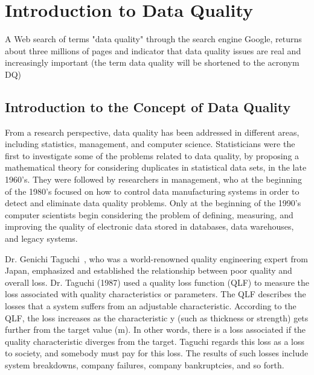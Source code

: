 

\ifpdf
    \graphicspath{{Chapter1/Figs/Raster/}{Chapter1/Figs/PDF/}{Chapter1/Figs/}}
\else
    \graphicspath{{Chapter1/Figs/Vector/}{Chapter1/Figs/}}
\fi

\chapter{Introduction to Data Quality}

A Web search of terms "data quality" through the search engine Google, returns about three millions of pages
and indicator that data quality issues are real and increasingly important (the term data quality will be shortened to the acronym DQ)

\ifpdf
    \graphicspath{{Chapter1/Figs/Raster/}{Chapter1/Figs/PDF/}{Chapter1/Figs/}}
\else
    \graphicspath{{Chapter1/Figs/Vector/}{Chapter1/Figs/}}
\fi

\section{Introduction to the Concept of Data Quality}

From a research perspective, data quality has been addressed in different
areas, including statistics, management, and computer science. Statisticians were the first to investigate some of the problems related to data quality, by
proposing a mathematical theory for considering duplicates in statistical data sets, in the late 1960's. They were followed by researchers in management, who
at the beginning of the 1980's focused on how to control data manufacturing systems in order to detect and eliminate data quality problems. Only at the
beginning of the 1990's computer scientists begin considering the problem of defining, measuring, and improving the quality of electronic data stored in
databases, data warehouses, and legacy systems.

Dr. Genichi Taguchi~\citep{Jugulum14}, who was a world-renowned quality engineering expert from Japan, emphasized and established the relationship between
poor quality and overall loss. Dr. Taguchi (1987) used a quality loss function (QLF) to measure the loss associated with quality characteristics
or parameters. The QLF describes the losses that a system suffers from an adjustable characteristic. According to the QLF, the loss increases as
the characteristic y (such as thickness or strength) gets further from the target value (m). In other words, there is a loss associated if the quality
characteristic diverges from the target. Taguchi regards this loss as a loss to society, and somebody must pay for this loss. The results of such losses
include system breakdowns, company failures, company bankruptcies, and so forth.

